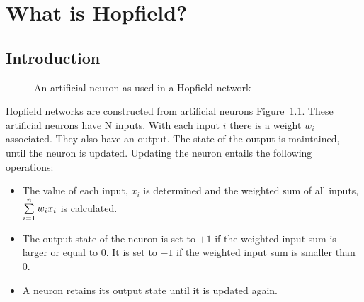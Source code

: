 \chapter{What is Hopfield?}
\section{Introduction}

\def\layersep{2.5cm}
\begin{figure}[h!]
\caption{An artificial neuron as used in a Hopfield network} 
\label{fig:simple_hopfield_network}
\centering
{}

\end{figure}

Hopfield networks are constructed from artificial neurons Figure~\ref{fig:simple_hopfield_network}. These
artificial neurons have N inputs. With each input $i$ there is a weight $w_i$ associated.
They also have an output. The state of the output is maintained, until
the neuron is updated. Updating the neuron entails the following operations:
	
\begin{itemize}
\item The value of each input, $x_i$ is determined and the weighted sum of all inputs,\(\vspace{2mm} \sum\limits_{i=1}^n {w_ix_i}\) is calculated.
\item The output state of the neuron is set to $+1$ if the weighted input sum is
larger or equal to $0$. It is set to $-1$ if the weighted input sum is smaller
than $0$.
\item A neuron retains its output state until it is updated again.
\end{itemize}

